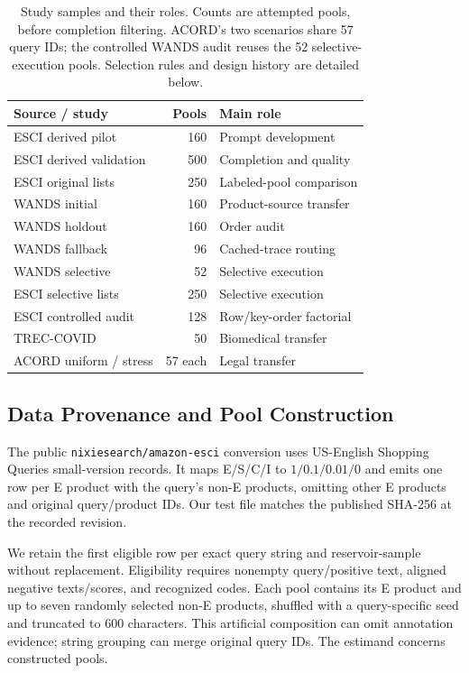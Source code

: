\documentclass[conference]{IEEEtran}
\begin{document}
\begin{table}[t]
\caption{Study samples and their roles. Counts are attempted pools, before completion filtering. ACORD's two scenarios share 57 query IDs; the controlled WANDS audit reuses the 52 selective-execution pools. Selection rules and design history are detailed below.}
\label{tab:studies}
\centering\footnotesize
\begin{tabular}{lrl}
\toprule
Source / study & Pools & Main role \\
\midrule
ESCI derived pilot & 160 & Prompt development \\
ESCI derived validation & 500 & Completion and quality \\
ESCI original lists & 250 & Labeled-pool comparison \\
WANDS initial & 160 & Product-source transfer \\
WANDS holdout & 160 & Order audit \\
WANDS fallback & 96 & Cached-trace routing \\
WANDS selective & 52 & Selective execution \\
ESCI selective lists & 250 & Selective execution \\
ESCI controlled audit & 128 & Row/key-order factorial \\
TREC-COVID & 50 & Biomedical transfer \\
ACORD uniform / stress & 57 each & Legal transfer \\
\bottomrule
\end{tabular}
\end{table}

\subsection{Data Provenance and Pool Construction}
The public \texttt{nixiesearch/amazon-esci} conversion \cite{derived} uses US-English Shopping Queries small-version records. It maps E/S/C/I to $1/0.1/0.01/0$ and emits one row per E product with the query's non-E products, omitting other E products and original query/product IDs. Our test file matches the published SHA-256 at the recorded revision.

We retain the first eligible row per exact query string and reservoir-sample without replacement. Eligibility requires nonempty query/positive text, aligned negative texts/scores, and recognized codes. Each pool contains its E product and up to seven randomly selected non-E products, shuffled with a query-specific seed and truncated to 600 characters. This artificial composition can omit annotation evidence; string grouping can merge original query IDs. The estimand concerns constructed pools.
\end{document}
